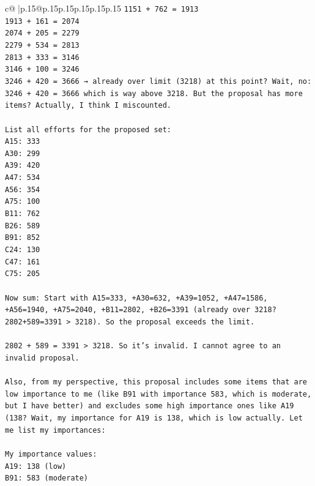 \documentclass{article}
\begin{document}
{\begin{supertabular}{c@{$\;$}|p{.15\linewidth}@{}p{.15\linewidth}p{.15\linewidth}p{.15\linewidth}p{.15\linewidth}p{.15\linewidth}}
{{{\texttt{1151 + 762 = 1913} \\
\texttt{1913 + 161 = 2074} \\
\texttt{2074 + 205 = 2279} \\
\texttt{2279 + 534 = 2813} \\
\texttt{2813 + 333 = 3146} \\
\texttt{3146 + 100 = 3246} \\
\texttt{3246 + 420 = 3666 → already over limit (3218) at this point? Wait, no: 3246 + 420 = 3666 which is way above 3218. But the proposal has more items? Actually, I think I miscounted.} \\
\\ 
\texttt{List all efforts for the proposed set:} \\
\texttt{A15: 333} \\
\texttt{A30: 299} \\
\texttt{A39: 420} \\
\texttt{A47: 534} \\
\texttt{A56: 354} \\
\texttt{A75: 100} \\
\texttt{B11: 762} \\
\texttt{B26: 589} \\
\texttt{B91: 852} \\
\texttt{C24: 130} \\
\texttt{C47: 161} \\
\texttt{C75: 205} \\
\\ 
\texttt{Now sum: Start with A15=333, +A30=632, +A39=1052, +A47=1586, +A56=1940, +A75=2040, +B11=2802, +B26=3391 (already over 3218? 2802+589=3391 > 3218). So the proposal exceeds the limit.} \\
\\ 
\texttt{2802 + 589 = 3391 > 3218. So it's invalid. I cannot agree to an invalid proposal.} \\
\\ 
\texttt{Also, from my perspective, this proposal includes some items that are low importance to me (like B91 with importance 583, which is moderate, but I have better) and excludes some high importance ones like A19 (138? Wait, my importance for A19 is 138, which is low actually. Let me list my importances:} \\
\\ 
\texttt{My importance values:} \\
\texttt{A19: 138 (low)} \\
\texttt{B91: 583 (moderate)} \\
}}}
\end{supertabular}}
\end{document}
